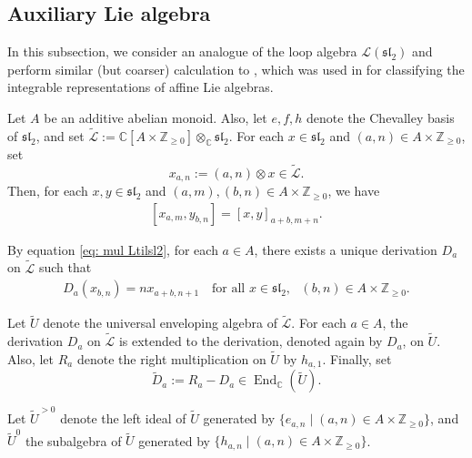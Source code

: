 \documentclass[12pt,a4paper]{amsart}
\theoremstyle{definition}
\numberwithin{equation}{subsection}
\begin{document}
\subsection{Auxiliary Lie algebra}\label{sect: aux Lie alg}
In this subsection, we consider an analogue of the loop algebra $\mathcal{L}(\mathfrak{sl}_2)$ and perform similar (but coarser) calculation to \cite[Section 7]{Gar78}, which was used in \cite{Cha86} for classifying the integrable representations of affine Lie algebras.

Let $A$ be an additive abelian monoid.
Also, let $e,f,h$ denote the Chevalley basis of $\mathfrak{sl}_2$, and set $\tilde{\mathcal{L}} := \mathbb{C}[A \times \mathbb{Z}_{\geq 0}] \otimes_\mathbb{C} \mathfrak{sl}_2$.
For each $x \in \mathfrak{sl}_2$ and $(a,n) \in A \times \mathbb{Z}_{\geq 0}$, set
\[
  x_{a,n} := (a,n) \otimes x \in \tilde{\mathcal{L}}.
\]
Then, for each $x,y \in \mathfrak{sl}_2$ and $(a,m),(b,n) \in A \times \mathbb{Z}_{\geq 0}$, we have
\begin{align}\label{eq: mul Ltilsl2}
  [x_{a,m},y_{b,n}] = [x,y]_{a+b,m+n}.
\end{align}

By equation \eqref{eq: mul Ltilsl2}, for each $a \in A$, there exists a unique derivation $D_{a}$ on $\tilde{\mathcal{L}}$ such that
\begin{align}\label{eq: def of Dab}
  D_{a}(x_{b,n}) = n x_{a+b,n+1} \text{ } \text{ for all } x \in \mathfrak{sl}_2, \text{ } (b,n) \in A \times \mathbb{Z}_{\geq 0}.
\end{align}

Let $\tilde{U}$ denote the universal enveloping algebra of $\tilde{\mathcal{L}}$.
For each $a \in A$, the derivation $D_a$ on $\tilde{\mathcal{L}}$ is extended to the derivation, denoted again by $D_a$, on $\tilde{U}$.
Also, let $R_a$ denote the right multiplication on $\tilde{U}$ by $h_{a,1}$.
Finally, set
\[
  \tilde{D}_a := R_a - D_a \in \operatorname{End}_\mathbb{C}(\tilde{U}).
\]

Let $\tilde{U}^{> 0}$ denote the left ideal of $\tilde{U}$ generated by $\{ e_{a,n} \mid (a,n) \in A \times \mathbb{Z}_{\geq 0} \}$, and $\tilde{U}^0$ the subalgebra of $\tilde{U}$ generated by $\{ h_{a,n} \mid (a,n) \in A \times \mathbb{Z}_{\geq 0} \}$.
\end{document}
